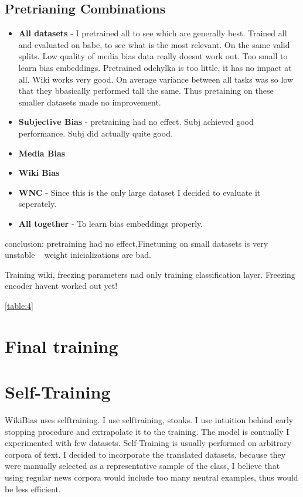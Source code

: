  
 
 
 
 \subsection{Pretrianing Combinations}
 \begin{itemize}
     \item \textbf{All datasets} -  I pretrained all to see which are generally best. Trained all and evaluated on babe, to see what is the most relevant. On the same valid splits. Low quality of media bias data really doesnt work out. Too small to learn bias embeddings.
     Pretrained odchylka is too little, it has no impact at all. Wiki works very good.
     On average variance between all tasks was so low that they bbasically performed tall the same. Thus pretaining on these smaller datasets made no improvement.
     \item \textbf{Subjective Bias} - pretraining had no effect. Subj achieved good performance. Subj did actually quite good.
     \item \textbf{Media Bias}
     \item \textbf{Wiki Bias} 
     \item \textbf{WNC} - Since this is the only large dataset I decided to evaluate it seperately.
     \item \textbf{All together} - To learn bias embeddings properly.
 \end{itemize}
 
 conclusion: pretraining had no effect,Finetuning on small datasets is very unstable ~ weight inicializations are bad.
 
 Training wiki, freezing parameters nad only training classification layer.
 Freezing encoder havent worked out yet!
 
 \ref{table:4}
 
 
\section{Final training}
 
\section{Self-Training}
WikiBias uses selftraining. I use selftraining, stonks.
I use intuition behind early stopping procedure and extrapolate it to the training. The model is contually 
I experimented with few datasets. Self-Training is usually performed on arbitrary corpora of text. I decided to incorporate the translated datasets, because they were manually selected as a representative sample of the class, I believe that using regular news corpora would include too many neutral examples, thus would be less efficient.




